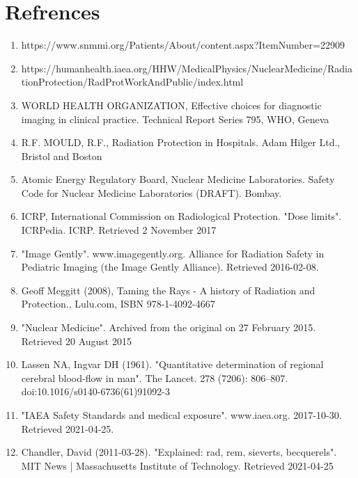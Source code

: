 \documentclass[12pt]{article}
\begin{document}
\section{Refrences}
\begin{enumerate}
\item 
https://www.snmmi.org/Patients/About/content.aspx?ItemNumber=22909
\item 
https://humanhealth.iaea.org/HHW/MedicalPhysics/NuclearMedicine/RadiationProtection/RadProtWorkAndPublic/index.html
\item
WORLD HEALTH ORGANIZATION, Effective choices for diagnostic imaging in clinical practice. Technical Report Series 795, WHO, Geneva
\item
R.F. MOULD, R.F., Radiation Protection in Hospitals. Adam Hilger Ltd., Bristol and Boston
\item
Atomic Energy Regulatory Board, Nuclear Medicine Laboratories. Safety Code for Nuclear Medicine Laboratories (DRAFT). Bombay.
\item
 ICRP, International Commission on Radiological Protection. "Dose limits". ICRPedia. ICRP. Retrieved 2 November 2017
\item
"Image Gently". www.imagegently.org. Alliance for Radiation Safety in Pediatric Imaging (the Image Gently Alliance). Retrieved 2016-02-08.
\item
Geoff Meggitt (2008), Taming the Rays - A history of Radiation and Protection., Lulu.com, ISBN 978-1-4092-4667
\item
 "Nuclear Medicine". Archived from the original on 27 February 2015. Retrieved 20 August 2015
\item
 Lassen NA, Ingvar DH (1961). "Quantitative determination of regional cerebral blood-flow in man". The Lancet. 278 (7206): 806–807. doi:10.1016/s0140-6736(61)91092-3
\item
 "IAEA Safety Standards and medical exposure". www.iaea.org. 2017-10-30. Retrieved 2021-04-25.
\item
Chandler, David (2011-03-28). "Explained: rad, rem, sieverts, becquerels". MIT News | Massachusetts Institute of Technology. Retrieved 2021-04-25



\end{enumerate}
\end{document}

